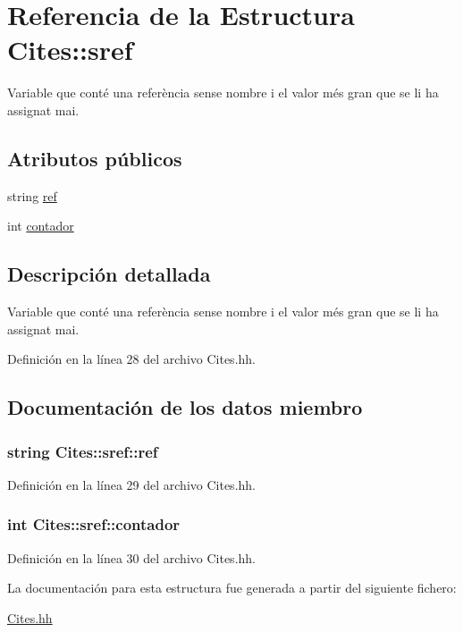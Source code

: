 \hypertarget{struct_cites_1_1sref}{}\section{Referencia de la Estructura Cites\+:\+:sref}
\label{struct_cites_1_1sref}


Variable que conté una referència sense nombre i el valor més gran que se li ha assignat mai.  


\subsection*{Atributos públicos}
\begin{DoxyCompactItemize}
\item 
string \hyperlink{struct_cites_1_1sref_ad6147916ce76c1499661861831f22b7b}{ref}
\item 
int \hyperlink{struct_cites_1_1sref_aa6eb576df71a10cc109a0380f2f190c3}{contador}
\end{DoxyCompactItemize}


\subsection{Descripción detallada}
Variable que conté una referència sense nombre i el valor més gran que se li ha assignat mai. 

Definición en la línea 28 del archivo Cites.\+hh.



\subsection{Documentación de los datos miembro}
\subsubsection[{\texorpdfstring{ref}{ref}}]{\setlength{\rightskip}{0pt plus 5cm}string Cites\+::sref\+::ref}\hypertarget{struct_cites_1_1sref_ad6147916ce76c1499661861831f22b7b}{}\label{struct_cites_1_1sref_ad6147916ce76c1499661861831f22b7b}


Definición en la línea 29 del archivo Cites.\+hh.

\subsubsection[{\texorpdfstring{contador}{contador}}]{\setlength{\rightskip}{0pt plus 5cm}int Cites\+::sref\+::contador}\hypertarget{struct_cites_1_1sref_aa6eb576df71a10cc109a0380f2f190c3}{}\label{struct_cites_1_1sref_aa6eb576df71a10cc109a0380f2f190c3}


Definición en la línea 30 del archivo Cites.\+hh.



La documentación para esta estructura fue generada a partir del siguiente fichero\+:\begin{DoxyCompactItemize}
\item 
\hyperlink{_cites_8hh}{Cites.\+hh}\end{DoxyCompactItemize}
